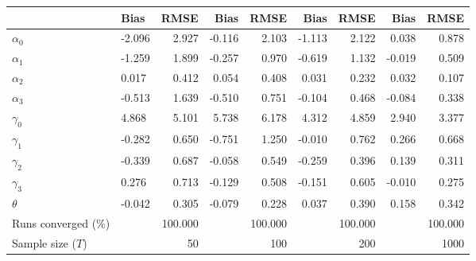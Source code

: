 
\begin{tabular}[t]{llrrrrrrr}
\toprule
  & Bias & RMSE & Bias & RMSE & Bias & RMSE & Bias & RMSE\\
\midrule
$\alpha_{0}$ & -2.096 & 2.927 & -0.116 & 2.103 & -1.113 & 2.122 & 0.038 & 0.878\\
$\alpha_{1}$ & -1.259 & 1.899 & -0.257 & 0.970 & -0.619 & 1.132 & -0.019 & 0.509\\
$\alpha_{2}$ & 0.017 & 0.412 & 0.054 & 0.408 & 0.031 & 0.232 & 0.032 & 0.107\\
$\alpha_{3}$ & -0.513 & 1.639 & -0.510 & 0.751 & -0.104 & 0.468 & -0.084 & 0.338\\
$\gamma_{0}$ & 4.868 & 5.101 & 5.738 & 6.178 & 4.312 & 4.859 & 2.940 & 3.377\\
$\gamma_{1}$ & -0.282 & 0.650 & -0.751 & 1.250 & -0.010 & 0.762 & 0.266 & 0.668\\
$\gamma_{2}$ & -0.339 & 0.687 & -0.058 & 0.549 & -0.259 & 0.396 & 0.139 & 0.311\\
$\gamma_{3}$ & 0.276 & 0.713 & -0.129 & 0.508 & -0.151 & 0.605 & -0.010 & 0.275\\
$\theta$ & -0.042 & 0.305 & -0.079 & 0.228 & 0.037 & 0.390 & 0.158 & 0.342\\
Runs converged (\%) &  & 100.000 &  & 100.000 &  & 100.000 &  & 100.000\\
Sample size ($T$) &  & 50 &  & 100 &  & 200 &  & 1000\\
\bottomrule
\end{tabular}
